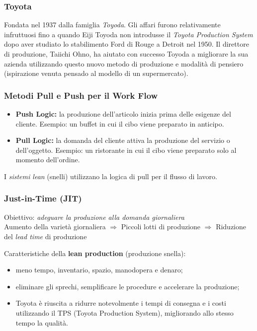 \documentclass[a4paper,portrait,12pt]{article}
\theoremstyle{definition}
\begin{document}
\subsubsection{Toyota}
Fondata nel 1937 dalla famiglia \emph{Toyoda}.
Gli affari furono relativamente infruttuosi fino a quando Eiji Toyoda non introdusse il \emph{Toyota Production System} dopo aver studiato lo stabilimento Ford di Rouge a Detroit nel 1950.
Il direttore di produzione, Taiichi Ohno, ha aiutato con successo Toyoda a migliorare la sua azienda utilizzando questo nuovo metodo di produzione e modalità di pensiero (ispirazione venuta pensado al modello di un supermercato).\\

\subsubsection{Metodi Pull e Push per il Work Flow}
\begin{itemize}
\item \textbf{Push Logic:} la produzione dell'articolo inizia prima delle esigenze del cliente.
Esempio: un buffet in cui il cibo viene preparato in anticipo.
\item \textbf{Pull Logic:} la domanda del cliente attiva la produzione del servizio o dell'oggetto.
Esempio: un ristorante in cui il cibo viene preparato solo al momento dell'ordine.
\end{itemize}
I \emph{sistemi lean} (snelli) utilizzano la logica di pull per il flusso di lavoro.

\subsubsection{Just-in-Time (JIT)}
\begin{center}
Obiettivo: \emph{adeguare la produzione alla domanda giornaliera}\\

Aumento della varietà giornaliera $\Rightarrow$ Piccoli lotti di produzione $\Rightarrow$ Riduzione del \emph{lead time} di produzione
\end{center}

Caratteristiche della \textbf{lean production} (produzione snella):
\begin{itemize}
\item meno tempo, inventario, spazio, manodopera e denaro;
\item eliminare gli sprechi, semplificare le procedure e accelerare la produzione;
\item Toyota è riuscita a ridurre notevolmente i tempi di consegna e i costi utilizzando il TPS (Toyota Production System), migliorando allo stesso tempo la qualità.
\end{itemize}
\end{document}
